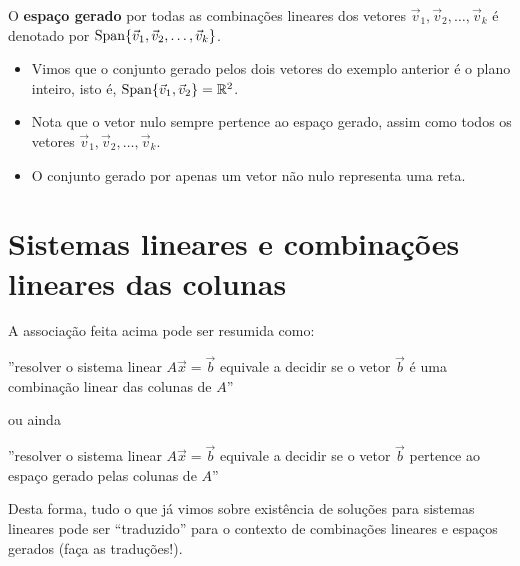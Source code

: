 \documentclass[../livro.tex]{subfiles}  %
\begin{document}
O \textbf{espaço gerado} por todas as combinações lineares dos vetores $\vec{v}_1, \vec{v}_2, \dots, \vec{v}_k$ é denotado por $\operatorname{Span} \{ \vec{v}_1, \vec{v}_2, \dots, \vec{v}_k \}$.

\begin{itemize}
\item Vimos que o conjunto gerado pelos dois vetores do exemplo anterior é o plano inteiro, isto é, $\operatorname{Span} \{ \vec{v}_1, \vec{v}_2 \} = \mathbb{R}^2$.
\item Nota que o vetor nulo sempre pertence ao espaço gerado, assim como todos os vetores $\vec{v}_1, \vec{v}_2, \dots, \vec{v}_k$.
\item O conjunto gerado por apenas um vetor não nulo representa uma reta.
\end{itemize}



\section{Sistemas lineares e combinações lineares das colunas}

A associação feita acima pode ser resumida como:
\begin{center}
  ''resolver o sistema linear $A \vec{x} = \vec{b}$ equivale a decidir
  se o vetor $\vec{b}$ é uma combinação linear das colunas de $A$''
\end{center}
ou ainda
\begin{center}
  ''resolver o sistema linear $A \vec{x} = \vec{b}$ equivale a decidir se o vetor $\vec{b}$ pertence ao espaço gerado pelas colunas de $A$''
\end{center}

Desta forma, tudo o que já vimos sobre existência de soluções para sistemas lineares pode ser ``traduzido'' para o contexto de combinações lineares e espaços gerados (faça as traduções!).
\end{document}
